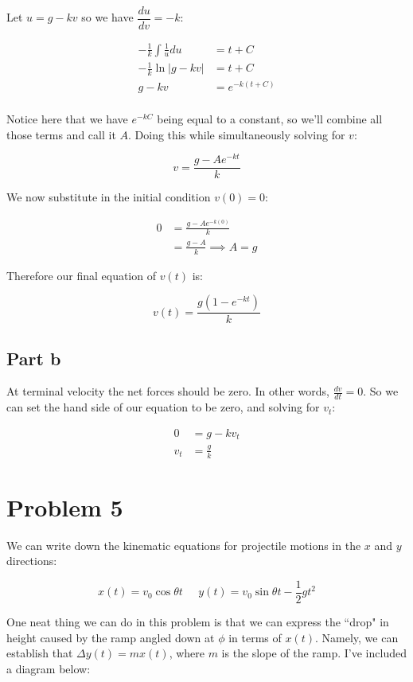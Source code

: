 \documentclass{article}
\theoremstyle{definition}
\numberwithin{equation}{section}
\numberwithin{definition}{section}
\begin{document}
	Let $u = g-kv$ so we have $\dfrac{du}{dv} = -k$:
	
	\begin{align*}
	 -\frac{1}{k} \int \frac {1}{u} du &= t + C\\
	 -\frac{1}{k} \ln|g - kv| &= t + C\\
	 g - kv &= e^{-k(t+C)}\\
	 \end{align*}
 
 	Notice here that we have $e^{-kC}$ being equal to a constant, so we'll combine all those terms and call it $A$. Doing this while simultaneously solving for $v$: 
 	
 	\[ v = \frac{g -Ae^{-kt}}{k}\]
 	
 	We now substitute in the initial condition $v(0) = 0$:
 	
 	\begin{align*}
 		0 &= \frac{g - Ae^{-k(0)}}{k}\\
 			&= \frac{g-A}{k} \implies A = g
 	\end{align*}
 
 Therefore our final equation of $v(t)$ is:
 
 \[ v(t) = \frac{g(1-e^{-kt})}{k}\]
 		
 		\subsection{Part b}
	
	At terminal velocity the net forces should be zero. In other words, $\frac{dv}{dt} = 0$. So we can set the hand side of our equation to be zero, and solving for $v_t$:
	
	\begin{align*}
		0 &= g - kv_t \\
		v_t &= \frac{g}{k}
	\end{align*}	

	\section{Problem 5}
	
	We can write down the kinematic equations for projectile motions in the $x$ and $y$ directions:
	
	\[ x(t) = v_0\cos\theta t \phantom{abc} y(t) = v_0\sin\theta t - \frac{1}{2}gt^2\]
	
	One neat thing we can do in this problem is that we can express the ``drop" in height caused by the ramp angled down at $\phi$ in terms of $x(t)$. Namely, we can establish that $\Delta y(t) = mx(t)$, where $m$ is the slope of the ramp. I've included a diagram below: 
	
\end{document}
